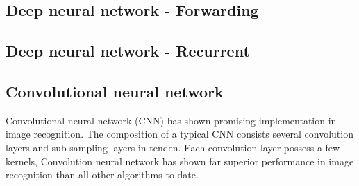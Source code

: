 \subsection{Deep neural network - Forwarding}
\subsection{Deep neural network - Recurrent}
\subsection{Convolutional neural network}
Convolutional neural network (CNN) has shown promising implementation in image recognition. The composition of a typical CNN consists several convolution layers and sub-sampling layers in tenden. Each convolution layer possess a few kernels, 
Convolution neural network has shown far superior performance in image recognition than all other algorithms to date.~\cite{Szegedy_2015}